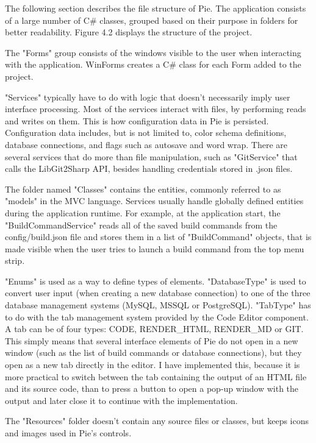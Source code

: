 The following section describes the file structure of Pie. The application consists of a large number of C\# classes, grouped based on their purpose in folders for better readability. Figure 4.2 displays the structure of the project.

The "Forms" group consists of the windows visible to the user when interacting with the application. WinForms creates a C\# class for each Form added to the project.

"Services" typically have to do with logic that doesn't necessarily imply user interface processing. Most of the services interact with files, by performing reads and writes on them. This is how configuration data in Pie is persisted. Configuration data includes, but is not limited to, color schema definitions, database connections, and flags such as autosave and word wrap. There are several services that do more than file manipulation, such as "GitService" that calls the LibGit2Sharp API, besides handling credentials stored in .json files.

The folder named "Classes" contains the entities, commonly referred to as "models" in the MVC language. Services usually handle globally defined entities during the application runtime. For example, at the application start, the "BuildCommandService" reads all of the saved build commands from the config/build.json file and stores them in a list of "BuildCommand" objects, that is made visible when the user tries to launch a build command from the top menu strip.

"Enums" is used as a way to define types of elements. "DatabaseType" is used to convert user input (when creating a new database connection) to one of the three database management systems (MySQL, MSSQL or PostgreSQL). "TabType" has to do with the tab management system provided by the Code Editor component. A tab can be of four types: CODE, RENDER\_HTML, RENDER\_MD or GIT. This simply means that several interface elements of Pie do not open in a new window (such as the list of build commands or database connections), but they open as a new tab directly in the editor. I have implemented this, because it is more practical to switch between the tab containing the output of an HTML file and its source code, than to press a button to open a pop-up window with the output and later close it to continue with the implementation.

The "Resources" folder doesn't contain any source files or classes, but keeps icons and images used in Pie's controls. 

